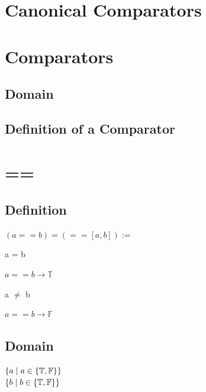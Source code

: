 \documentclass[11pt]{article}
\begin{document}
\section*{Canonical Comparators}




\section{Comparators}




\subsection{Domain}



\subsection{Definition of a Comparator}




\section{==}
\subsection{Definition}
\begin{center}
$
(a == b) = (==[a,b]) :=
$
\end{center}
a = b
\begin{center}
$
a == b \rightarrow \mathbb{T}
$
\end{center}
\vspace{2mm}
a $\neq$ b
\begin{center}
$
a == b \rightarrow \mathbb{F}
$
\end{center}
\subsection{Domain}
\begin{center}
$
\{a \hspace{1mm} | \hspace{1mm} a \in \{\mathbb{T},\mathbb{F}\} \}
$
\\ \vspace{2mm}
$
\{b \hspace{1mm} | \hspace{1mm} b \in \{\mathbb{T},\mathbb{F}\} \}
$
\end{center}
\end{document}
